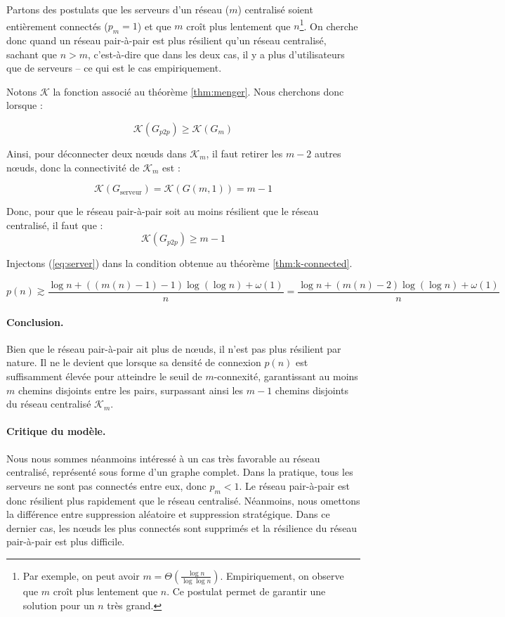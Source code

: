 \documentclass[french]{llncs}
\begin{document}
Partons des postulats que les serveurs d'un réseau (\(m\)) centralisé soient 
entièrement connectés (\(p_m=1\)) et que \(m\) croît plus lentement que 
\(n\)\footnote{Par exemple, on peut avoir \(m = \Theta(\frac{\log n}{\log \log 
n})\). Empiriquement, on observe que \(m\) croît plus lentement que \(n\). Ce 
postulat permet de garantir une solution pour un \(n\) très grand.}. On cherche 
donc quand un réseau pair-à-pair est plus résilient qu'un réseau centralisé, 
sachant que \(n>m\), c'est-à-dire que dans les deux cas, il y a plus 
d'utilisateurs que de serveurs -- ce qui est le cas empiriquement.

Notons \(\mathcal{K}\) la fonction associé au théorème \ref{thm:menger}. Nous 
cherchons donc lorsque :

\[
    \mathcal{K}(G_{p2p}) \geq \mathcal{K}(G_{m})
\]

Ainsi, pour déconnecter deux n\oe{}uds dans \(\mathcal{K}_m\), il faut retirer 
les \(m-2\) autres n\oe{}uds, donc la connectivité de \(\mathcal{K}_m\) est :

\begin{equation}
    \label{eq:server}
    \mathcal{K}(G_{\text{serveur}}) = \mathcal{K}(G(m,1))=m-1
\end{equation}

Donc, pour que le réseau pair-à-pair soit au moins résilient que le réseau 
centralisé, il faut que :
\[
    \mathcal{K}(G_{p2p}) \geq m-1
\]

Injectons (\ref{eq:server}) dans la condition obtenue au théorème 
\ref{thm:k-connected}.

\[
    p(n)\gtrsim \dfrac{\log n + ((m(n)-1)-1)\log(\log n)+\omega(1)}{n} = 
        \boxed{\dfrac{\log n + (m(n)-2)\log(\log n)+\omega(1)}{n}}
\]

\paragraph{Conclusion.} Bien que le réseau pair-à-pair ait plus de n\oe{}uds, 
il n'est pas plus résilient par nature. Il ne le devient que lorsque sa densité 
de connexion \(p(n)\) est suffisamment élevée pour atteindre le seuil de 
\(m\)-connexité, garantissant au moins \(m\) chemins disjoints entre les pairs, 
surpassant ainsi les \(m-1\) chemins disjoints du réseau centralisé 
\(\mathcal{K}_{m}\).

\paragraph{Critique du modèle.} Nous nous sommes néanmoins intéressé à un cas 
très favorable au réseau centralisé, représenté sous forme d'un graphe complet. 
Dans la pratique, tous les serveurs ne sont pas connectés entre eux, donc 
\(p_m<1\). Le réseau pair-à-pair est donc résilient plus rapidement que le 
réseau centralisé. Néanmoins, nous omettons la différence entre suppression 
aléatoire et suppression stratégique. Dans ce dernier cas, les n\oe{}uds les 
plus connectés sont supprimés et la résilience du réseau pair-à-pair est plus 
difficile.
\end{document}
